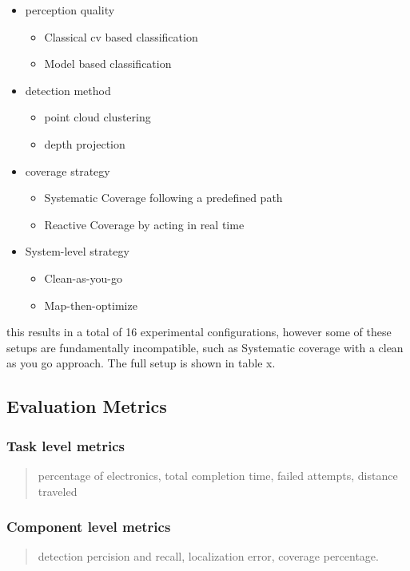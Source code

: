 \begin{itemize}
\item perception quality

\begin{itemize}
\item Classical cv based classification
\item Model based classification
\end{itemize}


\item detection method

\begin{itemize}
\item point cloud clustering
\item depth projection
\end{itemize}


\item coverage strategy

\begin{itemize}
\item Systematic Coverage following a predefined path
\item Reactive Coverage by acting in real time
\end{itemize}


\item System-level strategy

\begin{itemize}
\item Clean-as-you-go
\item Map-then-optimize
\end{itemize}
\end{itemize}

this results in a total of 16 experimental configurations, however some of these setups are fundamentally incompatible, such as Systematic coverage with a clean as you go approach. The full setup is shown in table x.

\subsection{Evaluation Metrics}

\subsubsection{Task level metrics}

\begin{quote}
percentage of electronics, total completion time, failed attempts, distance traveled
\end{quote}

\subsubsection{Component level metrics}

\begin{quote}
detection percision and recall, localization error, coverage percentage.
\end{quote}